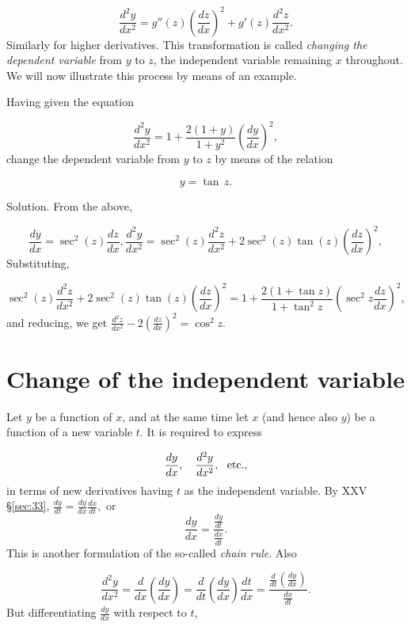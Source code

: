 \[
\frac{d^2 y}{dx^2} 
= g''(z) \left( \frac{dz}{dx} \right)^2 + g'(z) \frac{d^2 z}{dx^2}.
\]
Similarly for higher derivatives. This transformation is 
called {\it changing the dependent variable} from $y$ to $z$, 
the independent variable remaining $x$ throughout. 
We will now illustrate this process by means of an example.

\begin{example}
{\rm
Having given the equation

\[
\frac{d^2 y}{dx^2} = 
1 + \frac{2( 1 + y)}{1 + y^2} \left( \frac{dy}{dx} \right)^2,
\]
change the dependent variable from $y$ to $z$ by means of the relation

\[
y = \tan\, z.
\]

Solution. From the above, %

\[
  \frac{dy}{dx} 
= \sec^2 (z) \frac{dz}{dx}, \frac{d^2 y}{dx^2} 
= \sec^2 (z) \frac{d^2 z}{dx^2} 
+ 2 \sec^2 (z) \tan (z) \left( \frac{dz}{dx} \right)^2,
\]
Substituting, %

\[
    \sec^2 (z) \frac{d^2 z}{dx^2} 
+ 2 \sec^2 (z) \tan (z) \left( \frac{dz}{dx} \right)^2 
= 1 + \frac{2(1 + \tan z)}{1 + \tan^2 z} 
\left( \sec^2 z \frac{dz}{dx} \right)^2,
\]
and reducing, we get 
$\frac{d^2 z}{dx^2} - 2 \left( \frac{dz}{dx} \right)^2 = \cos^2 z$.
 
}
\end{example}

\section{Change of the independent variable}

Let $y$ be a function of $x$, and at the same time let $x$ 
(and hence also $y$) be a function of a new variable $t$. 
It is required to express

\[
  \frac{dy}{dx}, \ \ \ \frac{d^2 y}{dx^2},\ \ {\rm etc.},
\]
in terms of new derivatives having $t$ as the independent variable.
By XXV \S \ref{sec:33}, 
$
\frac{dy}{dt} 	= \frac{dy}{dx} \frac{dx}{dt},
$
or
\begin{equation}
\frac{dy}{dx} 	= \frac{ \frac{dy}{dt} }{ \frac{dx}{dt} }.
\label{eqn:A-97}
\end{equation}
This is another formulation of the so-called {\it chain rule}.
Also 	

\[
\frac{d^2 y}{dx^2} 
= \frac{d}{dx} \left( \frac{dy}{dx} \right) 	
= \frac{d}{dt} \left( \frac{dy}{dx} \right) \frac{dt}{dx} 
= \frac{ \frac{d}{dt} \left( \frac{dy}{dx} \right) }{ \frac{dx}{dt} }.
\]
But differentiating $\frac{dy}{dx}$ %
with respect to $t$,

